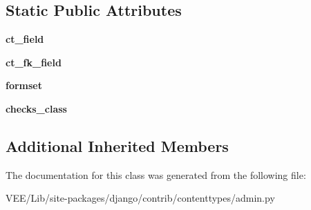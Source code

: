 \subsection*{Static Public Attributes}
\begin{DoxyCompactItemize}
\item 
\mbox{\label{classdjango_1_1contrib_1_1contenttypes_1_1admin_1_1_generic_inline_model_admin_a9895adda9da273732e8426bbca168464}} 
{\bfseries ct\+\_\+field}
\item 
\mbox{\label{classdjango_1_1contrib_1_1contenttypes_1_1admin_1_1_generic_inline_model_admin_a718cac63d5842242fc7c8320f5e8ec43}} 
{\bfseries ct\+\_\+fk\+\_\+field}
\item 
\mbox{\label{classdjango_1_1contrib_1_1contenttypes_1_1admin_1_1_generic_inline_model_admin_a67774d1ea701066677b3a41fe781508b}} 
{\bfseries formset}
\item 
\mbox{\label{classdjango_1_1contrib_1_1contenttypes_1_1admin_1_1_generic_inline_model_admin_a2db8618f156589573a39f2a741af987e}} 
{\bfseries checks\+\_\+class}
\end{DoxyCompactItemize}
\subsection*{Additional Inherited Members}


The documentation for this class was generated from the following file\+:\begin{DoxyCompactItemize}
\item 
V\+E\+E/\+Lib/site-\/packages/django/contrib/contenttypes/admin.\+py\end{DoxyCompactItemize}
